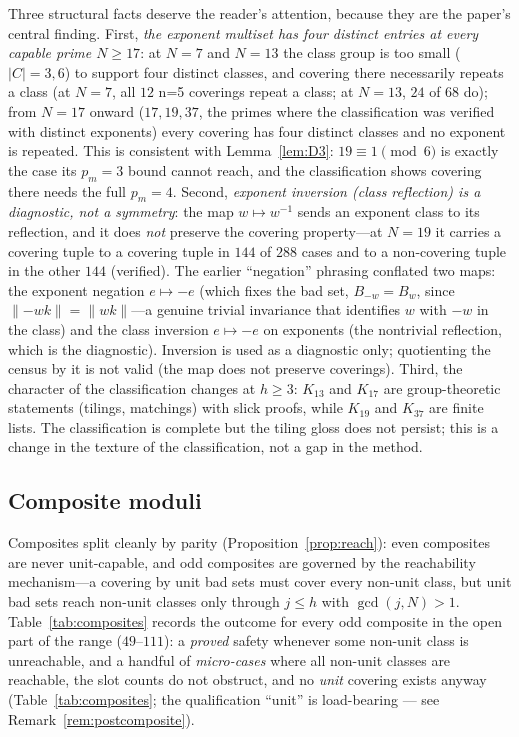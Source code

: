 \begin{remark}\label{rem:pattern}
Three structural facts deserve the reader's attention, because they are
the paper's central finding. First, \emph{the exponent multiset has four
distinct entries at every capable prime $N\ge 17$}: at $N=7$ and $N=13$
the class group is too small ($|C|=3,6$) to support four distinct
classes, and covering there necessarily repeats a class (at $N=7$, all
$12$ n=5 coverings repeat a class; at $N=13$, $24$ of $68$ do); from
$N=17$ onward ($17,19,37$, the primes where the classification was
verified with distinct exponents) every covering has four distinct
classes and no exponent is repeated. This is consistent with
Lemma~\ref{lem:D3}: $19\equiv 1\pmod 6$ is exactly the case its $p_m=3$
bound cannot reach, and the classification shows covering there needs the
full $p_m=4$. Second, \emph{exponent inversion (class reflection) is a
diagnostic, not a symmetry}: the map $w\mapsto w^{-1}$ sends an exponent
class to its reflection, and it does \emph{not} preserve the covering
property---at $N=19$ it carries a covering tuple to a covering tuple in
$144$ of $288$ cases and to a non-covering tuple in the other $144$
(verified). The earlier ``negation'' phrasing conflated two maps: the
exponent negation $e\mapsto-e$ (which fixes the bad set, $B_{-w}=B_w$,
since $\lVert-wk\rVert=\lVert wk\rVert$---a genuine trivial invariance
that identifies $w$ with $-w$ in the class) and the class inversion
$e\mapsto-e$ on exponents (the nontrivial reflection, which is the
diagnostic). Inversion is used as a diagnostic only; quotienting the census by
it is not valid (the map does not preserve coverings). Third, the character
of the classification changes at $h\ge 3$: $K_{13}$ and $K_{17}$ are
group-theoretic statements (tilings, matchings) with slick proofs, while
$K_{19}$ and $K_{37}$ are finite lists. The classification is complete but
the tiling gloss does not persist; this is a change in the texture of
the classification, not a gap in the method.
\end{remark}

\subsection{Composite moduli}\label{sec:composites}

Composites split cleanly by parity (Proposition~\ref{prop:reach}): even
composites are never unit-capable, and odd composites are governed by the
reachability mechanism---a covering by unit bad sets must cover every
non-unit class, but unit bad sets reach non-unit classes only through
$j\le h$ with $\gcd(j,N)>1$. Table~\ref{tab:composites} records the
outcome for every odd composite in the open part of the range
($49$--$111$): a \emph{proved} safety whenever some non-unit class is
unreachable, and a handful of \emph{micro-cases} where all non-unit
classes are reachable, the slot counts do not obstruct, and no \emph{unit}
covering exists anyway (Table~\ref{tab:composites}; the qualification
``unit'' is load-bearing --- see Remark~\ref{rem:postcomposite}).

